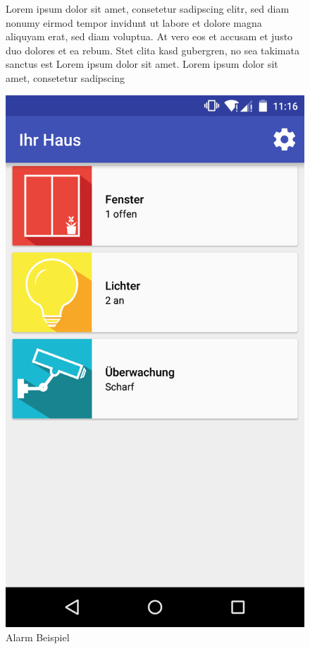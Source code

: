 \begin{figure}[htbp]
	\begin{minipage}{0.6\textwidth} 
Lorem ipsum dolor sit amet, consetetur sadipscing elitr, sed diam nonumy eirmod tempor invidunt ut labore et dolore magna aliquyam erat, sed diam voluptua. At vero eos et accusam et justo duo dolores et ea rebum. Stet clita kasd gubergren, no sea takimata sanctus est Lorem ipsum dolor sit amet. Lorem ipsum dolor sit amet, consetetur sadipscing 
	\end{minipage}
	\hfill
	\begin{minipage}{0.32\textwidth}
		\includegraphics[scale=0.12]{appendix/img/AppScreenshots/Screenshot7}
		\caption{Alarm Beispiel}
		\label{fig:screenshot_7}
	\end{minipage}
\end{figure}

